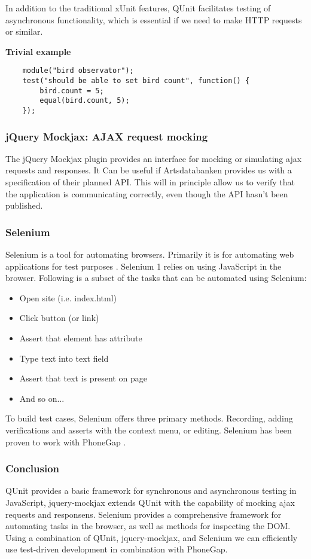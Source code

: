 	In addition to the traditional xUnit features, QUnit facilitates testing of
	asynchronous functionality, which is essential if we need to make HTTP
	requests or similar.

	\textbf{Trivial example}

\begin{lstlisting}
	module("bird observator");
	test("should be able to set bird count", function() {
		bird.count = 5;
		equal(bird.count, 5);
	});
\end{lstlisting}

\subsubsection{jQuery Mockjax: AJAX request mocking}

	The jQuery Mockjax plugin provides an interface for mocking or simulating
	ajax requests and responses. \cite{github:jquery-mockjax}It Can be useful if Artsdatabanken provides us
	with a specification of their planned API. This will in principle allow us
	to verify that the application is communicating correctly, even though the
	API hasn't been published.

\subsubsection{Selenium}

	Selenium is a tool for automating browsers. Primarily it is for automating
	web applications for test purposes \cite{seleniumhq:home}. Selenium 1 relies
	on using JavaScript in the browser. Following is a subset of the tasks that
	can be automated using Selenium:

	\begin{itemize}
		\item Open site (i.e. index.html)
		\item Click button (or link)
		\item Assert that element has attribute
		\item Type text into text field
		\item Assert that text is present on page
		\item And so on...
	\end{itemize}

	To build test cases, Selenium offers three primary methods. Recording, adding
	verifications and asserts with the context menu, or editing. Selenium has
	been proven to work with PhoneGap \cite{phonegap:automatic-test-cases}.

\subsubsection{Conclusion}

	QUnit provides a basic framework for synchronous and asynchronous testing in
	JavaScript, jquery-mockjax extends QUnit with the capability of mocking ajax
	requests and responsens. Selenium provides a comprehensive framework for
	automating tasks in the browser, as well as methods for inspecting the DOM.
	Using a combination of QUnit, jquery-mockjax, and Selenium we can
	efficiently use test-driven development in combination with PhoneGap.
